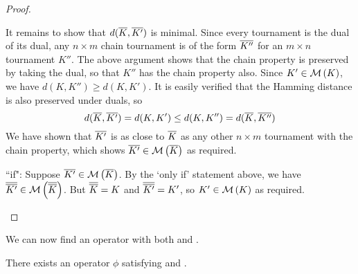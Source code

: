 \begin{proof}
\begin{itemize}
    It remains to show that $d({\overline{K}}, {\overline{K'}})$ is minimal. Since every
    tournament is the dual of its dual, any $n \times m$ chain tournament is of
    the form ${\overline{K''}}$ for an $m \times n$ tournament $K''$. The above
    argument shows that the chain property is preserved by taking the dual, so
    that $K''$ has the chain property also. Since $K' \in \operatorname{\mathcal{M}}\left({K}\right)$, we have
    $d(K, K'') \ge d(K, K')$. It is easily verified that the Hamming distance
    is also preserved under duals, so
    \[
        d({\overline{K}}, {\overline{K'}})
        = d(K, K')
        \le d(K, K'')
        = d({\overline{K}}, {\overline{K''}})
    \]
    We have shown that ${\overline{K'}}$ is as close to ${\overline{K}}$ as any other $n
    \times m$ tournament with the chain property, which shows ${\overline{K'}} \in
    \operatorname{\mathcal{M}}\left({{\overline{K}}}\right)$ as required.

    ``if": Suppose ${\overline{K'}} \in \operatorname{\mathcal{M}}\left({{\overline{K}}}\right)$. By the `only if' statement
    above, we have ${\overline{{\overline{K'}}}} \in \operatorname{\mathcal{M}}\left({{\overline{{\overline{K}}}}}\right)$. But
    ${\overline{{\overline{K}}}} = K$ and ${\overline{{\overline{K'}}}} = K'$, so $K' \in \operatorname{\mathcal{M}}\left({K}\right)$ as
    required.
    \end{itemize}
\end{proof}

We can now find an operator with both \chainmin{} and \dualaxiom{}.

\begin{proposition}
    \label{tourn_result_chainmin_dual_compatibility}
    There exists an operator $\phi$ satisfying \chainmin{} and
    \dualaxiom{}.
\end{proposition}

